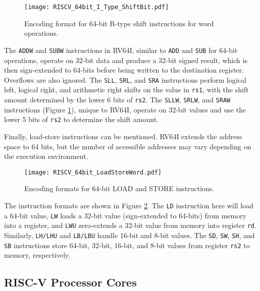 \begin{figure}[h!]
    \centering
    \texttt{[image: RISCV\_64bit\_I\_Type\_ShiftBit.pdf]}
    \caption{Encoding format for 64-bit R-type shift instructions for word operations. \cite{waterman2014riscv}}
    \label{fig:rv64i_shift_r_format}
\end{figure}

The \texttt{ADDW} and \texttt{SUBW} instructions in RV64I, similar to \texttt{ADD} and \texttt{SUB} for 64-bit operations, operate on 32-bit data and produce a 32-bit signed result, which is then sign-extended to 64-bits before being written to the destination register. Overflows are also ignored. The \texttt{SLL}, \texttt{SRL}, and \texttt{SRA} instructions perform logical left, logical right, and arithmetic right shifts on the value in \texttt{rs1}, with the shift amount determined by the lower 6 bits of \texttt{rs2}. The \texttt{SLLW}, \texttt{SRLW}, and \texttt{SRAW} instructions (Figure \ref{fig:rv64i_shift_r_format}), unique to RV64I, operate on 32-bit values and use the lower 5 bits of \texttt{rs2} to determine the shift amount.

Finally, load-store instructions can be mentioned. RV64I extends the address space to 64 bits, but the number of accessible addresses may vary depending on the execution environment.

\begin{figure}[h!]
    \centering
    \texttt{[image: RISCV\_64bit\_LoadStoreWord.pdf]}
    \caption{Encoding formats for 64-bit LOAD and STORE instructions. \cite{waterman2014riscv}}
    \label{fig:rv64i_load_store_format}
\end{figure}

The instruction formats are shown in Figure \ref{fig:rv64i_load_store_format}. The \texttt{LD} instruction here will load a 64-bit value, \texttt{LW} loads a 32-bit value (sign-extended to 64-bits) from memory into a register, and \texttt{LWU} zero-extends a 32-bit value from memory into register \texttt{rd}. Similarly, \texttt{LH/LHU} and \texttt{LB/LBU} handle 16-bit and 8-bit values. The \texttt{SD}, \texttt{SW}, \texttt{SH}, and \texttt{SB} instructions store 64-bit, 32-bit, 16-bit, and 8-bit values from register \texttt{rs2} to memory, respectively.

\subsection{RISC-V Processor Cores}

